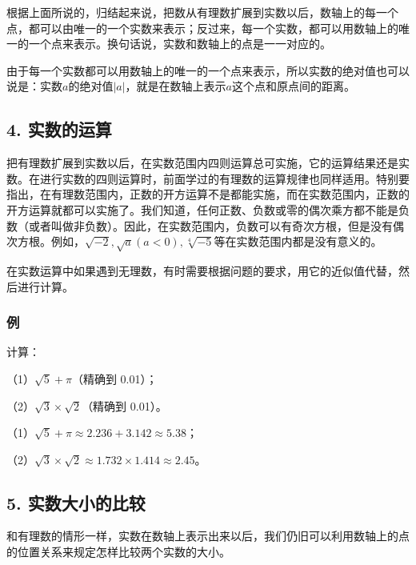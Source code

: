根据上面所说的，归结起来说，把数从有理数扩展到实数以后，数轴上的每一个点，都可以由唯一的一个实数来表示；反过来，每一个实数，都可以用数轴上的唯一的一个点来表示。换句话说，实数和数轴上的点是一一对应的。

由于每一个实数都可以用数轴上的唯一的一个点来表示，所以实数的绝对值也可以说是：实数\(a\)的绝对值\(|a|\)，就是在数轴上表示\(a\)这个点和原点间的距离。

\subsection{4. 实数的运算}

把有理数扩展到实数以后，在实数范围内四则运算总可实施，它的运算结果还是实数。在进行实数的四则运算时，前面学过的有理数的运算规律也同样适用。特别要指出，在有理数范围内，正数的开方运算不是都能实施，而在实数范围内，正数的开方运算就都可以实施了。我们知道，任何正数、负数或零的偶次乘方都不能是负数（或者叫做非负数）。因此，在实数范围内，负数可以有奇次方根，但是没有偶次方根。例如，\(\sqrt{-2}, \sqrt{a} (a < 0), \sqrt[4]{-5}\)等在实数范围内都是没有意义的。

在实数运算中如果遇到无理数，有时需要根据问题的要求，用它的近似值代替，然后进行计算。

\subsubsection{例}

计算：

（1）\(\sqrt{5} + \pi\)（精确到 0.01）；

（2）\(\sqrt{3} \times \sqrt{2}\)（精确到 0.01）。

（1）\(\sqrt{5} + \pi \approx 2.236 + 3.142 \approx 5.38\)；

（2）\(\sqrt{3} \times \sqrt{2} \approx 1.732 \times 1.414 \approx 2.45\)。

\subsection{5. 实数大小的比较}

和有理数的情形一样，实数在数轴上表示出来以后，我们仍旧可以利用数轴上的点的位置关系来规定怎样比较两个实数的大小。

